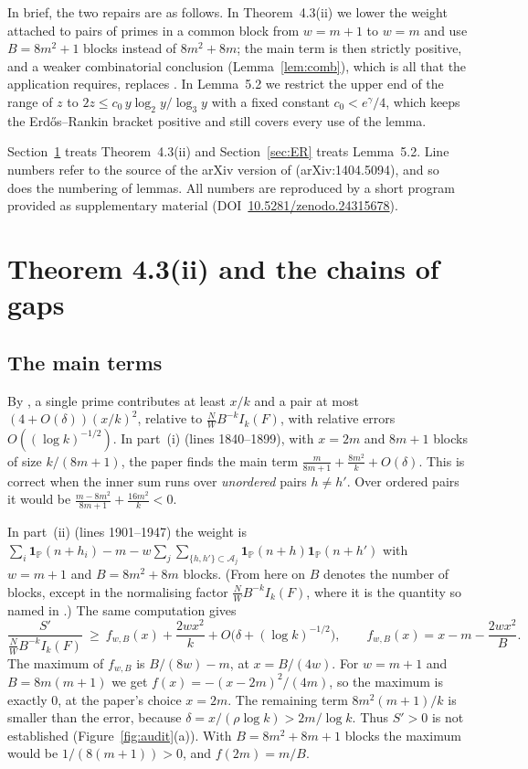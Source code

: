 \documentclass[11pt,a4paper]{amsart}
\theoremstyle{remark}
\newcommand{\cA}{\mathcal{A}}
\newcommand{\PP}{\mathbb{P}}
\begin{document}
In brief, the two repairs are as follows. In Theorem~4.3(ii) we lower the weight attached to pairs of primes in a
common block from $w=m+1$ to $w=m$ and use $B=8m^2+1$ blocks instead of $8m^2+8m$; the main term is then strictly
positive, and a weaker combinatorial conclusion (Lemma~\ref{lem:comb}), which is all that the application requires,
replaces \cite[(4.21)]{BFM}. In Lemma~5.2 we restrict the upper end of the range of $z$ to
$2z\le c_0\,y\log_2y/\log_3y$ with a fixed constant $c_0<e^\gamma/4$, which keeps the Erd\H{o}s--Rankin bracket
positive and still covers every use of the lemma.

Section~\ref{sec:tie} treats Theorem~4.3(ii) and Section~\ref{sec:ER} treats Lemma~5.2.
Line numbers refer to the source of the arXiv version of \cite{BFM} (arXiv:1404.5094), and so does the numbering
of lemmas. All numbers are reproduced by a short program provided as supplementary material
(DOI~\href{https://doi.org/10.5281/zenodo.24315678}{10.5281/zenodo.24315678}).

\section{Theorem 4.3(ii) and the chains of gaps}\label{sec:tie}

\subsection{The main terms}
By \cite[Lemmas~4.5 and~4.6]{BFM}, a single prime contributes at least $x/k$ and a pair at most
$(4+O(\delta))(x/k)^2$, relative to $\frac NWB^{-k}I_k(F)$, with relative errors $O((\log k)^{-1/2})$.
In part~(i) (lines 1840--1899), with $x=2m$ and $8m+1$ blocks of size $k/(8m+1)$, the paper finds the main term
$\frac m{8m+1}+\frac{8m^2}k+O(\delta)$. This is correct when the inner sum runs over \emph{unordered} pairs
$h\ne h'$. Over ordered pairs it would be $\frac{m-8m^2}{8m+1}+\frac{16m^2}k<0$.

In part~(ii) (lines 1901--1947) the weight is $\sum_i\mathbf 1_\PP(n+h_i)-m-w\sum_j\sum_{\{h,h'\}\subset\cA_j}\mathbf
1_\PP(n+h)\mathbf 1_\PP(n+h')$ with $w=m+1$ and $B=8m^2+8m$ blocks. (From here on $B$ denotes the number of blocks,
except in the normalising factor $\frac NWB^{-k}I_k(F)$, where it is the quantity so named in \cite[\S4]{BFM}.)
The same computation gives
\begin{equation}\label{eq:f}
\frac{S'}{\frac NWB^{-k}I_k(F)}\ \ge\ f_{w,B}(x)+\frac{2wx^2}k+O\bigl(\delta+(\log k)^{-1/2}\bigr),\qquad
f_{w,B}(x)=x-m-\frac{2wx^2}{B}.
\end{equation}
The maximum of $f_{w,B}$ is $B/(8w)-m$, at $x=B/(4w)$. For $w=m+1$ and $B=8m(m+1)$ we get $f(x)=-(x-2m)^2/(4m)$, so
the maximum is exactly $0$, at the paper's choice $x=2m$. The remaining term $8m^2(m+1)/k$ is smaller than the error,
because $\delta=x/(\rho\log k)>2m/\log k$. Thus $S'>0$ is not established (Figure~\ref{fig:audit}(a)). With
$B=8m^2+8m+1$ blocks the maximum would be $1/(8(m+1))>0$, and $f(2m)=m/B$.
\end{document}
